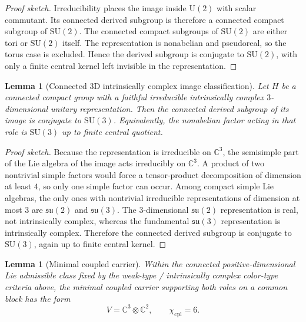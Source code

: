 \documentclass[11pt]{article}
\newtheorem{lemma}[theorem]{Lemma}
\newcommand{\SU}{\mathrm{SU}}
\newcommand{\U}{\mathrm{U}}
\begin{document}
\begin{proof}[Proof sketch]
Irreducibility places the image inside $\U(2)$ with scalar commutant. Its connected derived subgroup is therefore a connected compact subgroup of $\SU(2)$. The connected compact subgroups of $\SU(2)$ are either tori or $\SU(2)$ itself. The representation is nonabelian and pseudoreal, so the torus case is excluded. Hence the derived subgroup is conjugate to $\SU(2)$, with only a finite central kernel left invisible in the representation.
\end{proof}

\begin{lemma}[Connected 3D intrinsically complex image classification]\label{lem:su3class}
Let $H$ be a connected compact group with a faithful irreducible intrinsically complex $3$-dimensional unitary representation. Then the connected derived subgroup of its image is conjugate to $\SU(3)$. Equivalently, the nonabelian factor acting in that role is $\SU(3)$ up to finite central quotient.
\end{lemma}

\begin{proof}[Proof sketch]
Because the representation is irreducible on $\mathbb C^3$, the semisimple part of the Lie algebra of the image acts irreducibly on $\mathbb C^3$. A product of two nontrivial simple factors would force a tensor-product decomposition of dimension at least $4$, so only one simple factor can occur. Among compact simple Lie algebras, the only ones with nontrivial irreducible representations of dimension at most $3$ are $\mathfrak{su}(2)$ and $\mathfrak{su}(3)$. The $3$-dimensional $\mathfrak{su}(2)$ representation is real, not intrinsically complex, whereas the fundamental $\mathfrak{su}(3)$ representation is intrinsically complex. Therefore the connected derived subgroup is conjugate to $\SU(3)$, again up to finite central kernel.
\end{proof}

\begin{lemma}[Minimal coupled carrier]\label{lem:carrier}
Within the connected positive-dimensional Lie admissible class fixed by the weak-type / intrinsically complex color-type criteria above, the minimal coupled carrier supporting both roles on a common block has the form
\[
V=\mathbb C^3\otimes \mathbb C^2,
\qquad
\chi_{\mathrm{cpl}}=6.
\]
\end{lemma}
\end{document}
